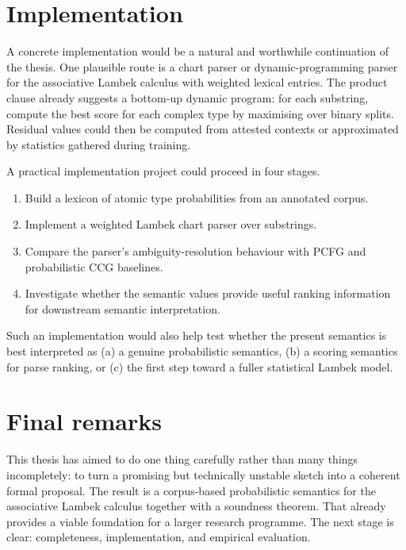 \documentclass[12pt,a4paper]{report}
\theoremstyle{definition}
\begin{document}
\section{Implementation}
A concrete implementation would be a natural and worthwhile continuation of the thesis.
One plausible route is a chart parser or dynamic-programming parser for the associative Lambek
calculus with weighted lexical entries. The product clause already suggests a bottom-up dynamic
program: for each substring, compute the best score for each complex type by maximising over
binary splits. Residual values could then be computed from attested contexts or approximated by
statistics gathered during training.

A practical implementation project could proceed in four stages.
\begin{enumerate}[label=(\arabic*)]
    \item Build a lexicon of atomic type probabilities from an annotated corpus.
    \item Implement a weighted Lambek chart parser over substrings.
    \item Compare the parser's ambiguity-resolution behaviour with PCFG and probabilistic CCG
    baselines.
    \item Investigate whether the semantic values provide useful ranking information for downstream
    semantic interpretation.
\end{enumerate}

Such an implementation would also help test whether the present semantics is best interpreted as
(a) a genuine probabilistic semantics, (b) a scoring semantics for parse ranking, or (c) the first
step toward a fuller statistical Lambek model.

\section{Final remarks}
This thesis has aimed to do one thing carefully rather than many things incompletely: to turn a
promising but technically unstable sketch into a coherent formal proposal. The result is a
corpus-based probabilistic semantics for the associative Lambek calculus together with a
soundness theorem. That already provides a viable foundation for a larger research programme.
The next stage is clear: completeness, implementation, and empirical evaluation.

\printbibliography
\end{document}
